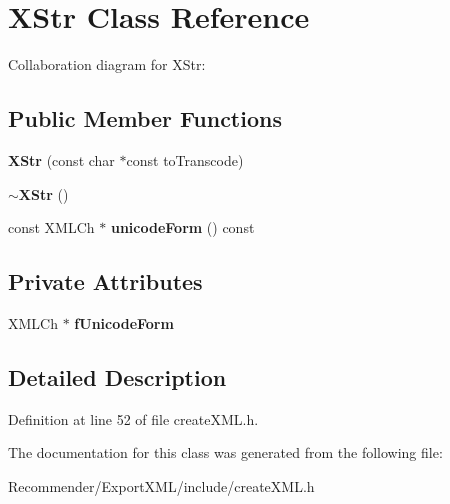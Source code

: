 \section{XStr Class Reference}
\label{classXStr}
Collaboration diagram for XStr:\subsection*{Public Member Functions}
\begin{CompactItemize}
\item 
{\bf XStr} (const char $\ast$const toTranscode)\label{classXStr_99ae5dfb4d91968dded6dc835c5f07eb}

\item 
{\bf $\sim$XStr} ()\label{classXStr_2d189339b730e8fdacd29cb8aba6fe94}

\item 
const XMLCh $\ast$ {\bf unicodeForm} () const\label{classXStr_07519d874ce9c348adb5d80817fb7fcf}

\end{CompactItemize}
\subsection*{Private Attributes}
\begin{CompactItemize}
\item 
XMLCh $\ast$ {\bf fUnicodeForm}\label{classXStr_4c532e2ffc7cecf1593a4114aea6491a}

\end{CompactItemize}


\subsection{Detailed Description}




Definition at line 52 of file createXML.h.

The documentation for this class was generated from the following file:\begin{CompactItemize}
\item 
Recommender/ExportXML/include/createXML.h\end{CompactItemize}

